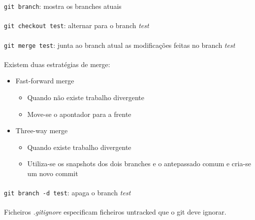 \documentclass[../resumosLPOO.tex]{subfiles}
\begin{document}
\lstinline{git branch}: mostra os branches atuais

\paragraph{}

\lstinline{git checkout test}: alternar para o branch \emph{test}

\paragraph{}

\lstinline{git merge test}: junta ao branch atual as modificações feitas no branch \emph{test}

\paragraph{}

Existem duas estratégias de merge:
\begin{itemize}
    \item Fast-forward merge
    \begin{itemize}
        \item Quando não existe trabalho divergente
        \item Move-se o apontador para a frente
    \end{itemize}
    \item Three-way merge
    \begin{itemize}
        \item Quando existe trabalho divergente
        \item Utiliza-se os snapshots dos dois branches e o antepassado comum e cria-se um novo commit
    \end{itemize}
\end{itemize}

\paragraph{}

\lstinline{git branch -d test}: apaga o branch \emph{test}

\paragraph{}

Ficheiros \emph{.gitignore} especificam ficheiros untracked que o git deve ignorar.

\paragraph{}
\end{document}
